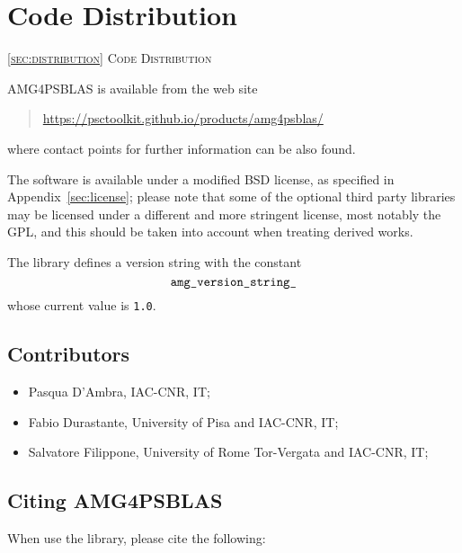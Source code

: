 \section{Code Distribution\label{sec:distribution}}
         {\textsc{\ref{sec:distribution} Code Distribution}}

\noindent
AMG4PSBLAS is available from the web site
\begin{quotation}
\href{https://psctoolkit.github.io/products/amg4psblas/}{https://psctoolkit.github.io/products/amg4psblas/}
\end{quotation}
where contact points for further information can be also found.

The software is available under a modified BSD license, as specified
in Appendix~\ref{sec:license}; please note that some of the optional
third party libraries may be licensed under a different and more
stringent license, most notably the GPL, and this should be taken into
account when treating derived works.

The library defines a version string with the
constant
\[ \verb|amg_version_string_|\]
whose current value is \verb|1.0|.

\subsection*{Contributors}
\begin{itemize}
\item Pasqua D'Ambra, IAC-CNR, IT;			
\item Fabio Durastante, University of Pisa and IAC-CNR, IT;
\item Salvatore  Filippone, University of Rome Tor-Vergata and IAC-CNR, IT;				
\end{itemize}

\subsection*{Citing AMG4PSBLAS}
When use the library, please cite the following:

